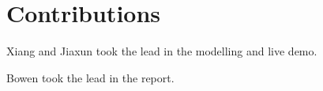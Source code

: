 \section{Contributions}

Xiang and Jiaxun took the lead in the modelling and live demo. 

Bowen took the lead in the report.

